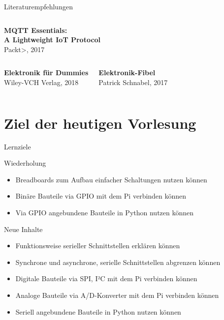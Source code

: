 {\begin{frame}{Literaturempfehlungen}
\begin{columns}
        \textbf{MQTT Essentials: \\ A Lightweight IoT Protocol} \\ Packt>, 2017
    \end{columns}

    \vskip 0.6cm

    \begin{columns}
        \textbf{Elektronik für Dummies} \\ Wiley-VCH Verlag, 2018

        \textbf{Elektronik-Fibel} \\ Patrick Schnabel, 2017
    \end{columns}
\end{frame}
}

\section{Ziel der heutigen Vorlesung}

\begin{frame}{Lernziele}
    \begin{block}{Wiederholung}
        \begin{itemize}
            \item Breadboards zum Aufbau einfacher Schaltungen nutzen können
            \item Binäre Bauteile via GPIO mit dem Pi verbinden können
            \item Via GPIO angebundene Bauteile in Python nutzen können
        \end{itemize}
    \end{block}

    \begin{block}{Neue Inhalte}
        \begin{itemize}
            \item Funktionsweise serieller Schnittstellen erklären können
            \item Synchrone und asynchrone, serielle Schnittstellen abgrenzen können
            \item Digitale Bauteile via SPI, I²C mit dem Pi verbinden können
            \item Analoge Bauteile via A/D-Konverter mit dem Pi verbinden können
            \item Seriell angebundene Bauteile in Python nutzen können
        \end{itemize}
    \end{block}
\end{frame}

